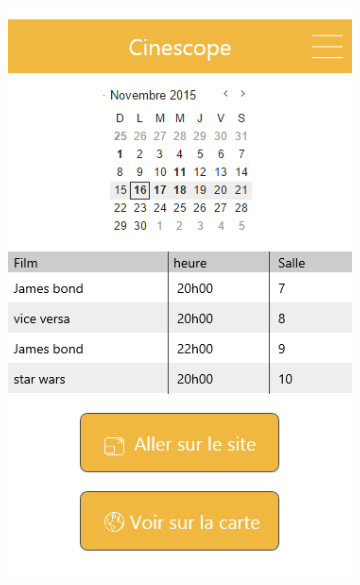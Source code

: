 \documentclass{eplmastersthesis}
\begin{document}
\begin{figure}[H]
\begin{subfigure}[b]{0.3\textwidth}
    \end{subfigure}
    ~ %
    \begin{subfigure}[b]{0.3\textwidth}
        \includegraphics[width=\textwidth]{Images/InVision/cinema.png}
    \end{subfigure}
    ~ %
    \begin{subfigure}[b]{0.3\textwidth}

\end{subfigure}
\end{figure}
\end{document}
